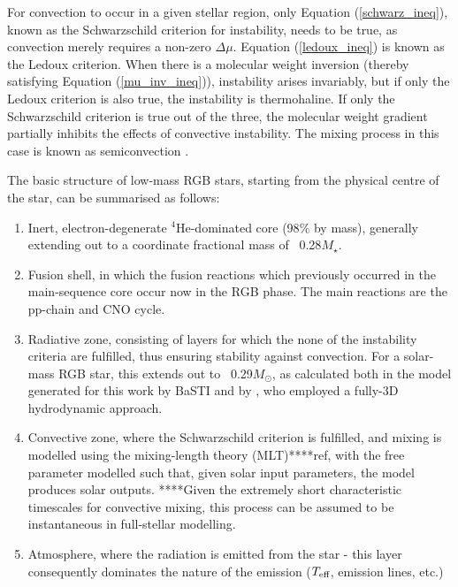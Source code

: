 \documentclass[12pt, a4paper]{report}
\begin{document}

For convection to occur in a given stellar region, only Equation (\ref{schwarz_ineq}), known as the Schwarzschild criterion for instability, needs to be true, as convection merely requires a non-zero $\Delta\mu$. Equation (\ref{ledoux_ineq}) is known as the Ledoux criterion. When there is a molecular weight inversion (thereby satisfying Equation (\ref{mu_inv_ineq})), instability arises invariably, but if only the Ledoux criterion is also true, the instability is thermohaline. If only the Schwarzschild criterion is true out of the three, the molecular weight gradient partially inhibits the effects of convective instability. The mixing process in this case is known as semiconvection \citep{2016ApJ...817...54M}.


The basic structure of low-mass  RGB stars, starting from the physical centre of the star, can be summarised as follows:

\begin{enumerate}
\item Inert, electron-degenerate $^{4}$He-dominated core (98$\%$ by mass), generally extending out to a coordinate fractional mass of ~0.28$M_{\star}$.
\item Fusion shell, in which the fusion reactions which previously occurred in the main-sequence core occur now in the RGB phase. The main reactions are the pp-chain and CNO cycle.
\item Radiative zone, consisting of layers for which the none of the instability criteria are fulfilled, thus ensuring stability against convection. For a solar-mass RGB star, this extends out to ~0.29$M_{\odot}$, as calculated both in the model generated for this work by BaSTI  and by \cite{2006Sci...314.1580E}, who employed a fully-3D hydrodynamic approach.
\item Convective zone, where the Schwarzschild criterion is fulfilled, and mixing is modelled using the mixing-length theory (MLT)****ref, with the free parameter modelled such that, given solar input parameters, the model produces solar outputs. ****Given the extremely short characteristic timescales for convective mixing, this process can be assumed to be instantaneous in full-stellar modelling.
\item Atmosphere, where the radiation is emitted from the star - this layer consequently dominates the nature of the emission ($T_{\textnormal{eff}}$, emission lines, etc.)
\end{enumerate}
\end{document}
